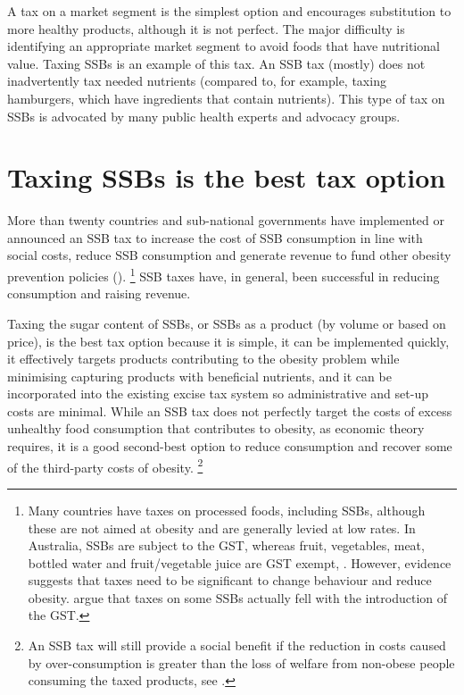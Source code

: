 \documentclass[embargoed]{grattan}
\begin{document}
A tax on a market segment is the simplest option and encourages substitution to more healthy products, although it is not perfect.
The major difficulty is identifying an appropriate market segment to avoid foods that have nutritional value.
Taxing SSBs is an example of this tax.
An SSB tax (mostly) does not inadvertently tax needed nutrients (compared to, for example, taxing hamburgers, which have ingredients that contain nutrients).
This type of tax on SSBs is advocated by many public health experts and advocacy groups.

\section{Taxing SSBs is the best tax option }\label{taxing-ssbs-is-the-best-tax-option}

More than twenty countries and sub-national governments have implemented or announced an SSB tax to increase the cost of SSB consumption in line with social costs, reduce SSB consumption and generate revenue to fund other obesity prevention policies ().%
\footnote{Many countries have taxes on processed foods, including SSBs, although these are not aimed at obesity and are generally levied at low rates. In Australia, SSBs are subject to the GST, whereas fruit, vegetables, meat, bottled water and fruit/vegetable juice are GST exempt, \textcite{Office2016GSTstatusfood}.
However, evidence suggests that taxes need to be significant to change behaviour and reduce obesity. \textcite{Australia2014Rethinktaxdiscussion} argue that taxes on some SSBs actually fell with the introduction of the GST.} SSB taxes have, in general, been successful in reducing consumption and raising revenue.

Taxing the sugar content of SSBs, or SSBs as a product (by volume or based on price), is the best tax option because it is simple, it can be implemented quickly, it effectively targets products contributing to the obesity problem while minimising capturing products with beneficial nutrients, and it can be incorporated into the existing excise tax system so administrative and set-up costs are minimal.
While an SSB tax does not perfectly target the costs of excess unhealthy food consumption that contributes to obesity, as economic theory requires, it is a good second-best option to reduce consumption and recover some of the third-party costs of obesity.%
\footnote{An SSB tax will still provide a social benefit if the reduction in costs caused by over-consumption is greater than the loss of welfare from non-obese people consuming the taxed products, see \textcite{CnossenExcisetaxationAustralia}.}
\end{document}
